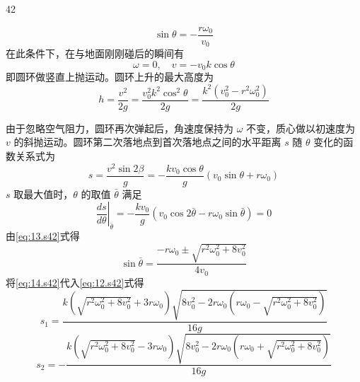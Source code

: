 \begin{solution}{42}
\begin{subsolution}
        \begin{equation}
            \sin\theta = -\frac{r \omega_{0}}{v_{0}}
            \label{eq:9.s42}
        \end{equation}
        在此条件下，在与地面刚刚碰后的瞬间有
        \begin{equation}
            \omega = 0,\quad v = -v_{0} k \cos\theta
            \label{eq:10.s42}
        \end{equation}
        即圆环做竖直上抛运动。圆环上升的最大高度为
        \begin{equation}
            h = \frac{v^{2}}{2g} = \frac{v_{0}^{2} k^{2} \cos^{2}\theta}{2g} = \frac{k^{2}(v_{0}^{2} - r^{2} \omega_{0}^{2})}{2g}
            \label{eq:11.s42}
        \end{equation}
    \end{subsolution}
    \begin{subsolution}
        由于忽略空气阻力，圆环再次弹起后，角速度保持为 $\omega$ 不变，质心做以初速度为 $v$ 的斜抛运动。圆环第二次落地点到首次落地点之间的水平距离 $s$ 随 $\theta$ 变化的函数关系式为
        \begin{equation}
            s = \frac{v^{2} \sin 2\beta}{g} = -\frac{k v_{0} \cos\theta}{g}(v_{0} \sin\theta + r \omega_{0})
            \label{eq:12.s42}
        \end{equation}
        $s$ 取最大值时，$\theta$ 的取值 $\bar{\theta}$ 满足
        \begin{equation}
            \left.\frac{ds}{d\theta}\right|_{\bar{\theta}} = -\frac{k v_{0}}{g}(v_{0} \cos 2\bar{\theta} - r \omega_{0} \sin\bar{\theta}) = 0
            \label{eq:13.s42}
        \end{equation}
        由\eqref{eq:13.s42}式得
        \begin{equation}
            \sin\bar{\theta} = \frac{-r \omega_{0} \pm \sqrt{r^{2} \omega_{0}^{2} + 8v_{0}^{2}}}{4v_{0}}
            \label{eq:14.s42}
        \end{equation}
        将\eqref{eq:14.s42}代入\eqref{eq:12.s42}式得
        \begin{equation}
            s_{1} = \frac{k\left(\sqrt{r^{2} \omega_{0}^{2} + 8v_{0}^{2}} + 3r \omega_{0}\right)\sqrt{8v_{0}^{2} - 2r \omega_{0}(r \omega_{0} - \sqrt{r^{2} \omega_{0}^{2} + 8v_{0}^{2}})}}{16g}
            \label{eq:15.s42}
        \end{equation}
        \begin{equation}
            s_{2} = -\frac{k\left(\sqrt{r^{2} \omega_{0}^{2} + 8v_{0}^{2}} - 3r \omega_{0}\right)\sqrt{8v_{0}^{2} - 2r \omega_{0}(r \omega_{0} + \sqrt{r^{2} \omega_{0}^{2} + 8v_{0}^{2}})}}{16g}

\end{equation}
\end{subsolution}
\end{solution}
